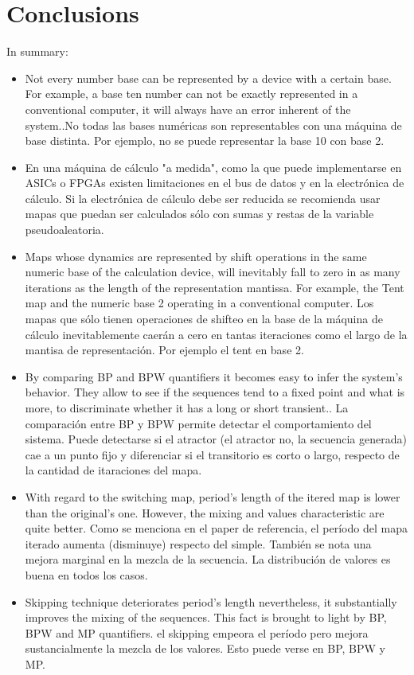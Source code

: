 \section{Conclusions}\label{sec:conclusions}
In summary:
\begin{itemize}
  \item Not every number base can be represented by a device with a certain base. For example, a base ten number can not be exactly represented in a conventional computer, it will always have an error inherent of the system..No todas las bases numéricas son representables con una máquina de base distinta. Por ejemplo, no se puede representar la base 10 con base 2.
  \item En una máquina de cálculo "a medida", como la que puede implementarse en ASICs o FPGAs existen limitaciones en el bus de datos y en la electrónica de cálculo. Si la electrónica de cálculo debe ser reducida se recomienda usar mapas que puedan ser calculados sólo con sumas y restas de la variable pseudoaleatoria.
  \item Maps whose dynamics are represented by shift operations in the same numeric base of the calculation device, will inevitably fall to zero in as many iterations as the length of the representation mantissa. For example, the Tent map and the numeric base 2 operating in a conventional computer. Los mapas que sólo tienen operaciones de shifteo en la base de la máquina de cálculo inevitablemente caerán a cero en tantas iteraciones como el largo de la mantisa de representación. Por ejemplo el tent en base 2.
  \item By comparing BP and BPW quantifiers it becomes easy to infer the system's behavior. They allow to see if the sequences tend to a fixed point and what is more, to discriminate whether it has a long or short transient.. La comparación entre BP y BPW permite detectar el comportamiento del sistema. Puede detectarse si el atractor (el atractor no, la secuencia generada) cae a un punto fijo y diferenciar si el transitorio es corto o largo, respecto de la cantidad de itaraciones del mapa.
  \item With regard to the switching map, period's length of the itered map is lower than the original's one. However, the mixing and values characteristic are quite better.  Como se menciona en el paper de referencia, el período del mapa iterado aumenta (disminuye) respecto del simple. También se nota una mejora marginal en la mezcla de la secuencia. La distribución de valores es buena en todos los casos.
  \item Skipping technique deteriorates period's length nevertheless, it substantially improves the mixing of the sequences. This fact is brought to light by BP, BPW and MP quantifiers. el skipping empeora el período pero mejora sustancialmente la mezcla de los valores. Esto puede verse en BP, BPW y MP.
\end{itemize}

